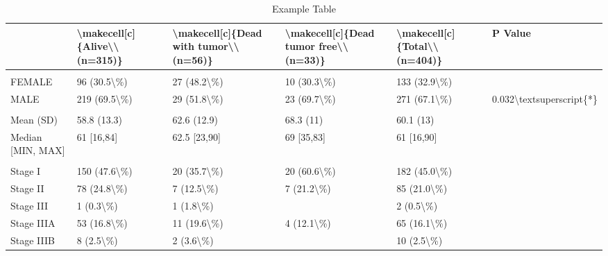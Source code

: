 \documentclass[
]{article}
\begin{document}
\begin{longtable}[t]{llllll}
\caption{\label{tab:unnamed-chunk-2}Example Table}\\
\toprule
 & \textbackslash{}makecell[c]\{Alive\textbackslash{}\textbackslash{}(n=315)\} & \textbackslash{}makecell[c]\{Dead with tumor\textbackslash{}\textbackslash{}(n=56)\} & \textbackslash{}makecell[c]\{Dead tumor free\textbackslash{}\textbackslash{}(n=33)\} & \textbackslash{}makecell[c]\{Total\textbackslash{}\textbackslash{}(n=404)\} & P Value\\
\midrule
\addlinespace[0.3em]
\multicolumn{6}{l}{\textbf{Gender}}\\
\hspace{1em}FEMALE & 96 (30.5\textbackslash{}\%) & 27 (48.2\textbackslash{}\%) & 10 (30.3\textbackslash{}\%) & 133 (32.9\textbackslash{}\%) & \\
\hspace{1em}MALE & 219 (69.5\textbackslash{}\%) & 29 (51.8\textbackslash{}\%) & 23 (69.7\textbackslash{}\%) & 271 (67.1\textbackslash{}\%) & 0.032\textbackslash{}textsuperscript\{*\}\\
\addlinespace[0.3em]
\multicolumn{6}{l}{\textbf{Age}}\\
\hspace{1em}Mean (SD) & 58.8 (13.3) & 62.6 (12.9) & 68.3 (11) & 60.1 (13) & \\
\hspace{1em}Median [MIN, MAX] & 61 [16,84] & 62.5 [23,90] & 69 [35,83] & 61 [16,90] & \\
\addlinespace[0.3em]
\multicolumn{6}{l}{\textbf{Stage}}\\
\hspace{1em}Stage I & 150 (47.6\textbackslash{}\%) & 20 (35.7\textbackslash{}\%) & 20 (60.6\textbackslash{}\%) & 182 (45.0\textbackslash{}\%) & \\
\hspace{1em}Stage II & 78 (24.8\textbackslash{}\%) & 7 (12.5\textbackslash{}\%) & 7 (21.2\textbackslash{}\%) & 85 (21.0\textbackslash{}\%) & \\
\hspace{1em}Stage III & 1 (0.3\textbackslash{}\%) & 1 (1.8\textbackslash{}\%) &  & 2 (0.5\textbackslash{}\%) & \\
\hspace{1em}Stage IIIA & 53 (16.8\textbackslash{}\%) & 11 (19.6\textbackslash{}\%) & 4 (12.1\textbackslash{}\%) & 65 (16.1\textbackslash{}\%) & \\
\hspace{1em}Stage IIIB & 8 (2.5\textbackslash{}\%) & 2 (3.6\textbackslash{}\%) &  & 10 (2.5\textbackslash{}\%) & \\

\end{longtable}
\end{document}
